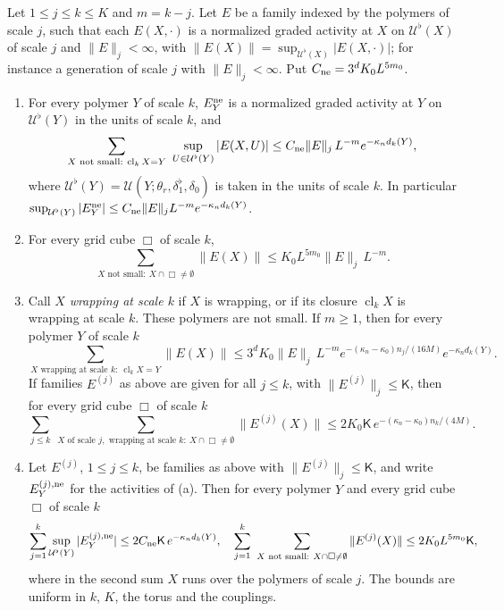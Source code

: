 \begin{lemma}\label{lem:large-later}
Let $1\le j\le k\le K$ and $m=k-j$. Let $E$ be a family indexed by the polymers of scale $j$, such that each $E(X,\cdot)$ is a normalized graded activity at $X$ on $\mathcal U^\flat(X)$ of scale $j$ and $\|E\|_j<\infty$, with $\|E(X)\|=\sup_{\mathcal U^\flat(X)}|E(X,\cdot)|$; for instance a generation of scale $j$ with $\|E\|_j<\infty$. Put $C_{\rm ne}=3^dK_0L^{5m_0}$.
\begin{enumerate}[label=(\alph*)]
\item For every polymer $Y$ of scale $k$, $E^{\rm ne}_Y$ is a normalized graded activity at $Y$ on $\mathcal U^\flat(Y)$ in the units of scale $k$, and
\[
\sum_{X\text{ not small}:\ \operatorname{cl}_kX=Y}\ \sup_{U\in\mathcal U^\flat(Y)}|E(X,U)|\le C_{\rm ne}\|E\|_j\,L^{-m}e^{-\kappa_nd_k(Y)},
\]
where $\mathcal U^\flat(Y)=\mathcal U(Y;\theta_r,\delta_1^\flat,\delta_0)$ is taken in the units of scale $k$. In particular $\sup_{\mathcal U^\flat(Y)}|E^{\rm ne}_Y|\le C_{\rm ne}\|E\|_jL^{-m}e^{-\kappa_nd_k(Y)}$.
\item For every grid cube $\Box$ of scale $k$,
\[
\sum_{X\text{ not small}:\ X\cap\Box\ne\emptyset}\|E(X)\|\le K_0L^{5m_0}\|E\|_j\,L^{-m}.
\]
\item Call $X$ \emph{wrapping at scale $k$} if $X$ is wrapping, or if its closure $\operatorname{cl}_kX$ is wrapping at scale $k$. These polymers are not small. If $m\ge1$, then for every polymer $Y$ of scale $k$
\[
\sum_{X\text{ wrapping at scale }k:\ \operatorname{cl}_kX=Y}\|E(X)\|\le3^dK_0\|E\|_j\,L^{-m}e^{-(\kappa_n-\kappa_0)n_j/(16M)}e^{-\kappa_nd_k(Y)} .
\]
If families $E^{(j)}$ as above are given for all $j\le k$, with $\|E^{(j)}\|_j\le\mathsf K$, then for every grid cube $\Box$ of scale $k$
\[
\sum_{j\le k}\ \sum_{X\text{ of scale }j,\text{ wrapping at scale }k:\ X\cap\Box\ne\emptyset}\|E^{(j)}(X)\|\le2K_0\mathsf K\,e^{-(\kappa_n-\kappa_0)n_k/(4M)} .
\]
\item Let $E^{(j)}$, $1\le j\le k$, be families as above with $\|E^{(j)}\|_j\le\mathsf K$, and write $E^{(j),\rm ne}_Y$ for the activities of (a). Then for every polymer $Y$ and every grid cube $\Box$ of scale $k$
\[
\sum_{j=1}^k\sup_{\mathcal U^\flat(Y)}|E^{(j),\rm ne}_Y|\le2C_{\rm ne}\mathsf K\,e^{-\kappa_nd_k(Y)},\quad\sum_{j=1}^k\ \sum_{X\text{ not small}:\ X\cap\Box\ne\emptyset}\|E^{(j)}(X)\|\le2K_0L^{5m_0}\mathsf K,
\]
where in the second sum $X$ runs over the polymers of scale $j$. The bounds are uniform in $k$, $K$, the torus and the couplings.
\end{enumerate}
\end{lemma}

